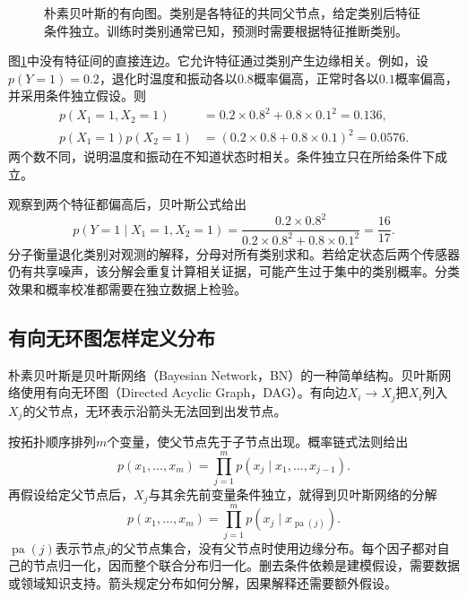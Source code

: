 \begin{figure}[htbp]
\centering
{}
\caption{朴素贝叶斯的有向图。类别是各特征的共同父节点，给定类别后特征条件独立。训练时类别通常已知，预测时需要根据特征推断类别。}
\label{fig:bayes-naive-structure}
\end{figure}

图\ref{fig:bayes-naive-structure}中没有特征间的直接连边。它允许特征通过类别产生边缘相关。例如，设$p(Y=1)=0.2$，退化时温度和振动各以$0.8$概率偏高，正常时各以$0.1$概率偏高，并采用条件独立假设。则
\begin{align}
 p(X_1=1,X_2=1)&=0.2\times0.8^2+0.8\times0.1^2=0.136,\\
 p(X_1=1)p(X_2=1)&=(0.2\times0.8+0.8\times0.1)^2=0.0576.
\end{align}
两个数不同，说明温度和振动在不知道状态时相关。条件独立只在所给条件下成立。

观察到两个特征都偏高后，贝叶斯公式给出
\begin{equation}
 p(Y=1\mid X_1=1,X_2=1)
 =\frac{0.2\times0.8^2}{0.2\times0.8^2+0.8\times0.1^2}
 =\frac{16}{17}.
\end{equation}
分子衡量退化类别对观测的解释，分母对所有类别求和。若给定状态后两个传感器仍有共享噪声，该分解会重复计算相关证据，可能产生过于集中的类别概率。分类效果和概率校准都需要在独立数据上检验。

\subsection{有向无环图怎样定义分布}
朴素贝叶斯是贝叶斯网络（Bayesian Network，BN）的一种简单结构。贝叶斯网络使用有向无环图（Directed Acyclic Graph，DAG）。有向边$X_i\to X_j$把$X_i$列入$X_j$的父节点，无环表示沿箭头无法回到出发节点。

按拓扑顺序排列$m$个变量，使父节点先于子节点出现。概率链式法则给出
\begin{equation}
 p(x_1,\ldots,x_m)=\prod_{j=1}^m p(x_j\mid x_1,\ldots,x_{j-1}).
\end{equation}
再假设给定父节点后，$X_j$与其余先前变量条件独立，就得到贝叶斯网络的分解
\begin{equation}
 p(x_1,\ldots,x_m)=\prod_{j=1}^m p(x_j\mid x_{\operatorname{pa}(j)}).
 \label{eq:bayes-dag-factorization}
\end{equation}
$\operatorname{pa}(j)$表示节点$j$的父节点集合，没有父节点时使用边缘分布。每个因子都对自己的节点归一化，因而整个联合分布归一化。删去条件依赖是建模假设，需要数据或领域知识支持。箭头规定分布如何分解，因果解释还需要额外假设。

